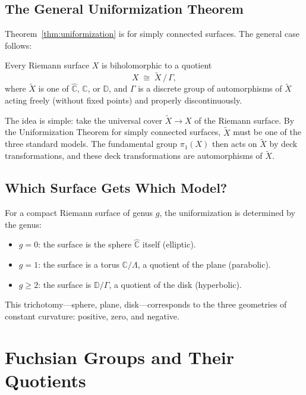 \subsection{The General Uniformization Theorem}

Theorem~\ref{thm:uniformization} is for simply connected surfaces. The general case follows:

\begin{corollary}
\label{cor:general-uniformization}
Every Riemann surface $X$ is biholomorphic to a quotient
\[
    X \;\cong\; \widetilde{X}\, /\, \Gamma,
\]
where $\widetilde{X}$ is one of $\widehat{\mathbb{C}}$, $\mathbb{C}$, or $\mathbb{D}$, and $\Gamma$ is a discrete group of automorphisms of $\widetilde{X}$ acting freely (without fixed points) and properly discontinuously.
\end{corollary}

The idea is simple: take the universal cover $\widetilde{X} \to X$ of the Riemann surface. By the Uniformization Theorem for simply connected surfaces, $\widetilde{X}$ must be one of the three standard models. The fundamental group $\pi_1(X)$ then acts on $\widetilde{X}$ by deck transformations, and these deck transformations are automorphisms of $\widetilde{X}$.

\subsection{Which Surface Gets Which Model?}

For a compact Riemann surface of genus $g$, the uniformization is determined by the genus:

\begin{itemize}
    \item $g = 0$: the surface is the sphere $\widehat{\mathbb{C}}$ itself (elliptic).
    \item $g = 1$: the surface is a torus $\mathbb{C}/\Lambda$, a quotient of the plane (parabolic).
    \item $g \geq 2$: the surface is $\mathbb{D}/\Gamma$, a quotient of the disk (hyperbolic).
\end{itemize}

This trichotomy---sphere, plane, disk---corresponds to the three geometries of constant curvature: positive, zero, and negative.

\section{Fuchsian Groups and Their Quotients}

